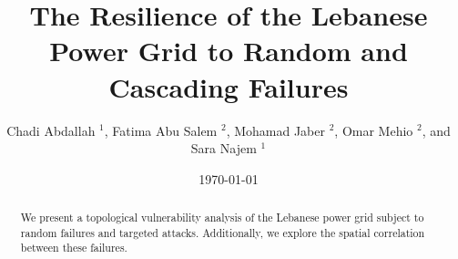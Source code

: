 \documentclass[twocolumn,showpacs,preprintnumbers,amsmath,amssymb,floatfix]{revtex4}
\begin{document}
\author{Chadi Abdallah $^{1}$, Fatima Abu Salem $^{2}$, Mohamad  Jaber $^{2}$, Omar Mehio $^{2}$, and Sara Najem $^{1}$}


\date{\today}


\begin{abstract}
We present a topological vulnerability analysis of the Lebanese power grid subject to random failures and targeted attacks. Additionally, we explore the spatial correlation between these failures. 
 \end{abstract}
 
 
\title{The Resilience of the Lebanese Power Grid to Random and Cascading Failures}

\maketitle








\end{document}
